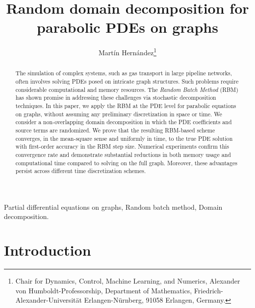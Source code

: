 \documentclass[a4paper, 10pt, english]{article}
\providecommand{\keywords}[1]{\noindent {\textit{Keywords:}} #1}
\begin{document}
	\title{Random domain decomposition for parabolic PDEs on graphs}
	
\author{Mart\'{i}n Hern\'{a}ndez\thanks{Chair for Dynamics, Control, Machine Learning, and Numerics, Alexander von Humboldt-Professorship, Department of Mathematics,  Friedrich-Alexander-Universit\"at Erlangen-N\"urnberg, 91058 Erlangen, Germany.} }



\maketitle
	

\begin{abstract}
The simulation of complex systems, such as gas transport in large pipeline networks, often involves solving PDEs posed on intricate graph structures. Such problems require considerable computational and memory resources. The \emph{Random Batch Method} (RBM) has shown promise in addressing these challenges via stochastic decomposition techniques. In this paper, we apply the RBM at the PDE level for parabolic equations on graphs, {without assuming any preliminary discretization in space or time}. We consider a non-overlapping domain decomposition in which the PDE coefficients and source terms are randomized. We prove that the resulting RBM-based scheme converges, in the mean-square sense and uniformly in time, to the true PDE solution with first-order accuracy in the RBM step size. Numerical experiments confirm this convergence rate and demonstrate substantial reductions in both memory usage and computational time compared to solving on the full graph. Moreover, these advantages persist across different time discretization schemes.
\end{abstract}


\maketitle


\keywords{Partial differential equations on graphs, Random batch method, Domain decomposition.}




\section{Introduction}
\end{document}
